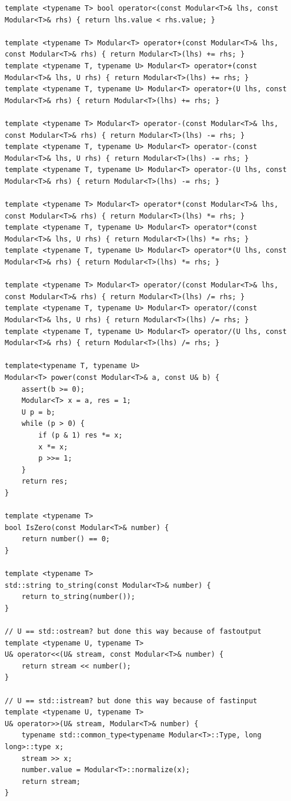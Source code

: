 \documentclass[twoside]{article}
\begin{document}
\begin{lstlisting}
template <typename T> bool operator<(const Modular<T>& lhs, const Modular<T>& rhs) { return lhs.value < rhs.value; }
 
template <typename T> Modular<T> operator+(const Modular<T>& lhs, const Modular<T>& rhs) { return Modular<T>(lhs) += rhs; }
template <typename T, typename U> Modular<T> operator+(const Modular<T>& lhs, U rhs) { return Modular<T>(lhs) += rhs; }
template <typename T, typename U> Modular<T> operator+(U lhs, const Modular<T>& rhs) { return Modular<T>(lhs) += rhs; }
 
template <typename T> Modular<T> operator-(const Modular<T>& lhs, const Modular<T>& rhs) { return Modular<T>(lhs) -= rhs; }
template <typename T, typename U> Modular<T> operator-(const Modular<T>& lhs, U rhs) { return Modular<T>(lhs) -= rhs; }
template <typename T, typename U> Modular<T> operator-(U lhs, const Modular<T>& rhs) { return Modular<T>(lhs) -= rhs; }
 
template <typename T> Modular<T> operator*(const Modular<T>& lhs, const Modular<T>& rhs) { return Modular<T>(lhs) *= rhs; }
template <typename T, typename U> Modular<T> operator*(const Modular<T>& lhs, U rhs) { return Modular<T>(lhs) *= rhs; }
template <typename T, typename U> Modular<T> operator*(U lhs, const Modular<T>& rhs) { return Modular<T>(lhs) *= rhs; }
 
template <typename T> Modular<T> operator/(const Modular<T>& lhs, const Modular<T>& rhs) { return Modular<T>(lhs) /= rhs; }
template <typename T, typename U> Modular<T> operator/(const Modular<T>& lhs, U rhs) { return Modular<T>(lhs) /= rhs; }
template <typename T, typename U> Modular<T> operator/(U lhs, const Modular<T>& rhs) { return Modular<T>(lhs) /= rhs; }
 
template<typename T, typename U>
Modular<T> power(const Modular<T>& a, const U& b) {
    assert(b >= 0);
    Modular<T> x = a, res = 1;
    U p = b;
    while (p > 0) {
        if (p & 1) res *= x;
        x *= x;
        p >>= 1;
    }
    return res;
}
 
template <typename T>
bool IsZero(const Modular<T>& number) {
    return number() == 0;
}
 
template <typename T>
std::string to_string(const Modular<T>& number) {
    return to_string(number());
}
 
// U == std::ostream? but done this way because of fastoutput
template <typename U, typename T>
U& operator<<(U& stream, const Modular<T>& number) {
    return stream << number();
}
 
// U == std::istream? but done this way because of fastinput
template <typename U, typename T>
U& operator>>(U& stream, Modular<T>& number) {
    typename std::common_type<typename Modular<T>::Type, long long>::type x;
    stream >> x;
    number.value = Modular<T>::normalize(x);
    return stream;
}
 

\end{lstlisting}
\end{document}
